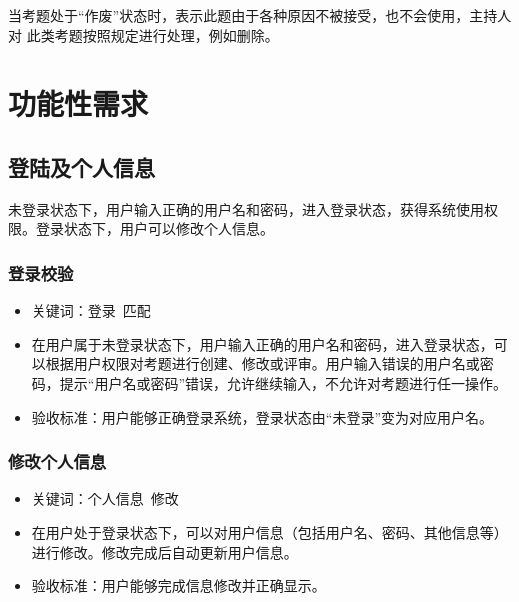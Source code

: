 \documentclass[hyperref, a4paper]{ctexart}
\providecommand{\tightlist}{%
  \setlength{\itemsep}{0pt}\setlength{\parskip}{0pt}}
\begin{document}
当考题处于``作废''状态时，表示此题由于各种原因不被接受，也不会使用，主持人对
此类考题按照规定进行处理，例如删除。

\hypertarget{ux529fux80fdux6027ux9700ux6c42}{%
\section{功能性需求}\label{ux529fux80fdux6027ux9700ux6c42}}

\hypertarget{ux767bux9646ux53caux4e2aux4ebaux4fe1ux606f}{%
\subsection{登陆及个人信息}\label{ux767bux9646ux53caux4e2aux4ebaux4fe1ux606f}}

未登录状态下，用户输入正确的用户名和密码，进入登录状态，获得系统使用权限。登录状态下，用户可以修改个人信息。

\hypertarget{ux767bux5f55ux6821ux9a8c}{%
\subsubsection{登录校验}\label{ux767bux5f55ux6821ux9a8c}}

\begin{itemize}
\tightlist
\item
  关键词：登录~匹配
\item
  在用户属于未登录状态下，用户输入正确的用户名和密码，进入登录状态，可以根据用户权限对考题进行创建、修改或评审。用户输入错误的用户名或密码，提示``用户名或密码''错误，允许继续输入，不允许对考题进行任一操作。
\item
  验收标准：用户能够正确登录系统，登录状态由``未登录''变为对应用户名。
\end{itemize}

\hypertarget{ux4feeux6539ux4e2aux4ebaux4fe1ux606f}{%
\subsubsection{修改个人信息}\label{ux4feeux6539ux4e2aux4ebaux4fe1ux606f}}

\begin{itemize}
\tightlist
\item
  关键词：个人信息~修改
\item
  在用户处于登录状态下，可以对用户信息（包括用户名、密码、其他信息等）进行修改。修改完成后自动更新用户信息。
\item
  验收标准：用户能够完成信息修改并正确显示。
\end{itemize}
\end{document}
